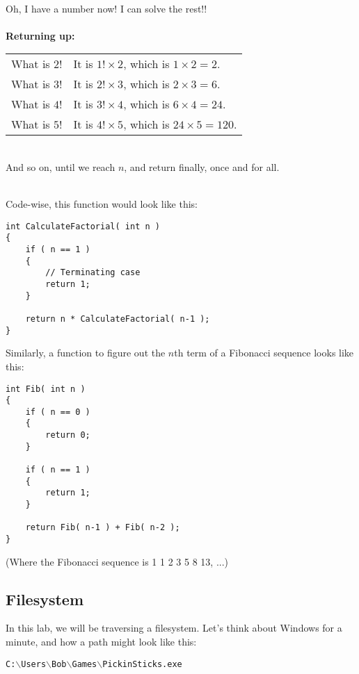 \documentclass[a4paper,12pt,oneside]{book}
\begin{document}
    ~\\
    Oh, I have a number now! I can solve the rest!!
    ~\\~\\
    \textbf{Returning up:}
    ~\\

\begin{tabular}{p{6cm} p{6cm}}
    What is $2!$ & It is $1! \times 2$, which is $1 \times 2 = 2$.
    \\
    What is $3!$ & It is $2! \times 3$, which is $2 \times 3 = 6$.
    \\
    What is $4!$ & It is $3! \times 4$, which is $6 \times 4 = 24$.
    \\
    What is $5!$ & It is $4! \times 5$, which is $24 \times 5 = 120$.
\end{tabular}

~\\
And so on, until we reach $n$, and return finally, once and for all.

~\\
Code-wise, this function would look like this:

\begin{lstlisting}[style=code]
int CalculateFactorial( int n )
{
    if ( n == 1 )
    {
        // Terminating case
        return 1;
    }

    return n * CalculateFactorial( n-1 );
}
\end{lstlisting}

\newpage
{}
Similarly, a function to figure out the $n$th term of a Fibonacci sequence looks like this:

\begin{lstlisting}[style=code]
int Fib( int n )
{
    if ( n == 0 )
    {
        return 0;
    }

    if ( n == 1 )
    {
        return 1;
    }

    return Fib( n-1 ) + Fib( n-2 );
}
\end{lstlisting}

(Where the Fibonacci sequence is 1 1 2 3 5 8 13, ...)

\subsection{Filesystem}

In this lab, we will be traversing a filesystem. Let's think about Windows
for a minute, and how a path might look like this:

\begin{center}
    \texttt{C:$\backslash$Users$\backslash$Bob$\backslash$Games$\backslash$PickinSticks.exe}
\end{center}
\end{document}
